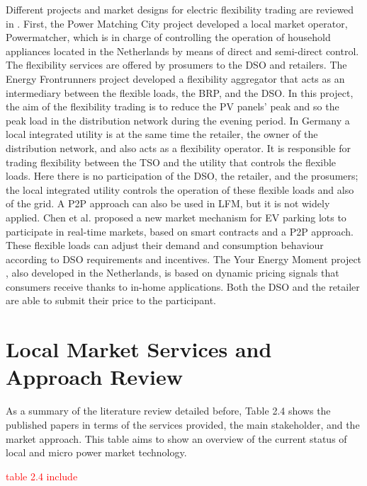 Different projects and market designs for electric flexibility trading are reviewed in \cite{eid2016market}. First, the Power Matching City project developed a local market operator, Powermatcher, which is in charge of controlling the operation of household appliances located in the Netherlands by means of direct and semi-direct control. 
The flexibility services are offered by prosumers to the DSO and retailers. The Energy Frontrunners project developed a flexibility aggregator that acts as an intermediary between the flexible loads, the BRP, and the DSO. In this project, the aim of the flexibility trading is to reduce the PV panels' peak and so the peak load in the distribution network during the evening period. In Germany a local integrated utility is at the same time the retailer, the owner of the distribution network, and also acts as a flexibility operator. It is responsible for trading flexibility between the TSO and the utility that controls the flexible loads. Here there is no participation of the DSO, the retailer, and the prosumers; the local integrated utility controls the operation of these flexible
loads and also of the grid.
A P2P approach can also be used in LFM, but it is not widely applied. Chen et al. \cite{chen2017integrated} proposed a new market mechanism for EV parking lots to participate in real-time markets, based on smart contracts and a P2P approach. These flexible loads can adjust their demand and consumption behaviour according to DSO requirements and incentives. The Your Energy Moment project \cite{eid2016market}, also developed in the Netherlands, is based on dynamic pricing signals that consumers receive thanks to in-home applications. Both the DSO and
the retailer are able to submit their price to the participant.

\section{Local Market Services and Approach Review}
As a summary of the literature review detailed before, Table 2.4 shows the published papers in terms of the services provided, the main stakeholder, and the market approach. This table aims to show an overview of the current status of local and micro power market technology.

\textcolor{red}{table 2.4 include}

